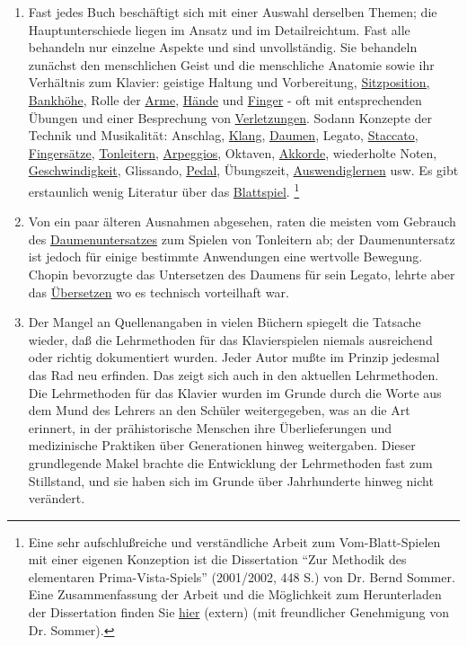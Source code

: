 \begin{enumerate}[label={\arabic*.}]
\item Fast jedes Buch beschäftigt sich mit einer Auswahl derselben Themen; die Hauptunterschiede liegen im Ansatz und im Detailreichtum.
Fast alle behandeln nur einzelne Aspekte und sind unvollständig.
Sie behandeln zunächst den menschlichen Geist und die menschliche Anatomie sowie ihr Verhältnis zum Klavier: geistige Haltung und Vorbereitung, \hyperlink{c1ii3}{Sitzposition, Bankhöhe}, Rolle der \hyperlink{c1ii10}{Arme}, \hyperlink{c1iii4}{Hände} und \hyperlink{c1iii4b}{Finger} - oft mit entsprechenden Übungen und einer Besprechung von \hyperlink{c1iii10hand}{Verletzungen}.
Sodann Konzepte der Technik und Musikalität: Anschlag, \hyperlink{c1iii1}{Klang}, \hyperlink{c1iii5a}{Daumen}, Legato, \hyperlink{c1iii1c}{Staccato}, \hyperlink{c1ii18}{Fingersätze}, \hyperlink{c1iii5a}{Tonleitern}, \hyperlink{Arpeggios}{Arpeggios}, Oktaven, \hyperlink{c1iii7e}{Akkorde}, wiederholte Noten, \hyperlink{c1ii13}{Geschwindigkeit}, Glissando, \hyperlink{c1ii23}{Pedal}, Übungszeit, \hyperlink{c1iii6}{Auswendiglernen} usw.
Es gibt erstaunlich wenig Literatur über das \hyperlink{c1iii11}{Blattspiel}.
\hypertarget{c030530}{}\footnote{Eine sehr aufschlußreiche und verständliche Arbeit zum Vom-Blatt-Spielen mit einer eigenen Konzeption ist die Dissertation \enquote{Zur Methodik des elementaren Prima-Vista-Spiels} (2001/2002, 448 S.) von Dr. Bernd Sommer.
Eine Zusammenfassung der Arbeit und die Möglichkeit zum Herunterladen der Dissertation finden Sie \hyperref[http://www.dissertation.de/buch.php3?buch=1405]{hier} (extern) (mit freundlicher Genehmigung von Dr. Sommer).}

\item Von ein paar älteren Ausnahmen abgesehen, raten die meisten vom Gebrauch des \hyperlink{c1iii5a}{Daumenuntersatzes} zum Spielen von Tonleitern ab; der Daumenuntersatz ist jedoch für einige bestimmte Anwendungen eine wertvolle Bewegung.
Chopin bevorzugte das Untersetzen des Daumens für sein Legato, lehrte aber das \hyperlink{c1iii5a2}{Übersetzen} wo es technisch vorteilhaft war.

\item Der Mangel an Quellenangaben in vielen Büchern spiegelt die Tatsache wieder, daß die Lehrmethoden für das Klavierspielen niemals ausreichend oder richtig dokumentiert wurden.
Jeder Autor mußte im Prinzip jedesmal das Rad neu erfinden.
Das zeigt sich auch in den aktuellen Lehrmethoden.
Die Lehrmethoden für das Klavier wurden im Grunde durch die Worte aus dem Mund des Lehrers an den Schüler weitergegeben, was an die Art erinnert, in der prähistorische Menschen ihre Überlieferungen und medizinische Praktiken über Generationen hinweg weitergaben.
Dieser grundlegende Makel brachte die Entwicklung der Lehrmethoden fast zum Stillstand, und sie haben sich im Grunde über Jahrhunderte hinweg nicht verändert.


\end{enumerate}
